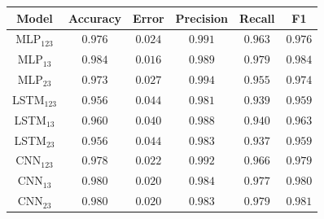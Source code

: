 \documentclass[a4paper,fleqn]{cas-sc}
\begin{document}
\begin{minipage}{0.45\textwidth}
	\begingroup
	\begin{tiny}	
		\setlength{\tabcolsep}{3pt}
		\renewcommand{\arraystretch}{1.15}
		
		
		\begin{tabular*}{\textwidth}{@{} CCCCCC@{} }
			\toprule
			Model&Accuracy&Error&Precision&Recall&F1 \\
			\midrule
				MLP$_{123}$ & $0.976$ & $0.024$ & $0.991$ & $0.963$ & $0.976$ \\
				MLP$_{13}$ & $0.984$ & $0.016$ & $0.989$ & $0.979$ & $0.984$ \\
				MLP$_{23}$ & $0.973$ & $0.027$ & $0.994$ & $0.955$ & $0.974$ \\
				LSTM$_{123}$ & $0.956$ & $0.044$ & $0.981$ & $0.939$ & $0.959$ \\
				LSTM$_{13}$ & $0.960$ & $0.040$ & $0.988$ & $0.940$ & $0.963$ \\
				LSTM$_{23}$ & $0.956$ & $0.044$ & $0.983$ & $0.937$ & $0.959$ \\
				CNN$_{123}$ & $0.978$ & $0.022$ & $0.992$ & $0.966$ & $0.979$ \\
				CNN$_{13}$ & $0.980$ & $0.020$ & $0.984$ & $0.977$ & $0.980$ \\
				CNN$_{23}$ & $0.980$ & $0.020$ & $0.983$ & $0.979$ & $0.981$ \\			
			\bottomrule
		\end{tabular*}
		\vspace{-0.3cm}
		\label{tab:metricas_generalizacao_100Mbps_teste}
	\end{tiny}
	\endgroup
\end{minipage}
\end{document}
